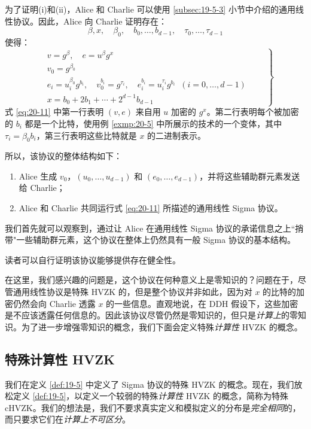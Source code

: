 为了证明(i)和(ii)，Alice 和 Charlie 可以使用 \ref{subsec:19-5-3} 小节中介绍的通用线性协议。因此，Alice 向 Charlie 证明存在：
\[
\beta,x,
\quad
\beta_0,
\quad
b_0,\dots,b_{d-1},
\quad
\tau_0,\dots,\tau_{d-1}
\]
使得：
\begin{equation}\label{eq:20-11}
\left.
\begin{aligned}
& v=g^\beta,
\quad
e=u^\beta g^x\\
& v_0=g^{\beta_0}\\
& e_i=u_i^{\beta_0}g^{b_i},
\quad
v_0^{b_i}=g^{\tau_i},
\quad
e_i^{b_i}=u_i^{\tau_i}g^{b_i}\;\;(i=0,\dots,d-1)\\
& x=b_0+2b_1+\cdots+2^{d-1}b_{d-1}
\end{aligned}
\quad\quad
\right\}
\end{equation}
式 \ref{eq:20-11} 中第一行表明 $(v,e)$ 来自用 $u$ 加密的 $g^x$。第二行表明每个被加密的 $b_i$ 都是一个比特，使用例 \ref{exmp:20-5} 中所展示的技术的一个变体，其中 $\tau_i=\beta_0b_i$，第三行表明这些比特就是 $x$ 的二进制表示。

所以，该协议的整体结构如下：
\begin{enumerate}
	\item Alice 生成 $v_0$，$(u_0,\dots,u_{d-1})$ 和 $(e_0,\dots,e_{d-1})$，并将这些辅助群元素发送给 Charlie；
	\item Alice 和 Charlie 共同运行式 \ref{eq:20-11} 所描述的通用线性 Sigma 协议。
\end{enumerate}

我们首先就可以观察到，通过让 Alice 在通用线性 Sigma 协议的承诺信息之上``捎带"一些辅助群元素，这个协议在整体上仍然具有一般 Sigma 协议的基本结构。

读者可以自行证明该协议能够提供存在健全性。

在这里，我们感兴趣的问题是，这个协议在何种意义上是零知识的？问题在于，尽管通用线性协议是特殊 HVZK 的，但是整个协议并非如此，因为对 $x$ 的比特的加密仍然会向 Charlie 透露 $x$ 的一些信息。直观地说，在 DDH 假设下，这些加密是不应该透露任何信息的。因此该协议尽管仍然是零知识的，但只是\emph{计算上}的零知识。为了进一步增强零知识的概念，我们下面会定义特殊\emph{计算性} HVZK 的概念。

\subsection{特殊计算性 HVZK}

我们在定义 \ref{def:19-5} 中定义了 Sigma 协议的特殊 HVZK 的概念。现在，我们放松定义 \ref{def:19-5}，以定义一个较弱的特殊\emph{计算性} HVZK 的概念，简称为特殊 cHVZK。我们的想法是，我们不要求真实定义和模拟定义的分布是\emph{完全相同}的，而只要求它们在\emph{计算上不可区分}。

